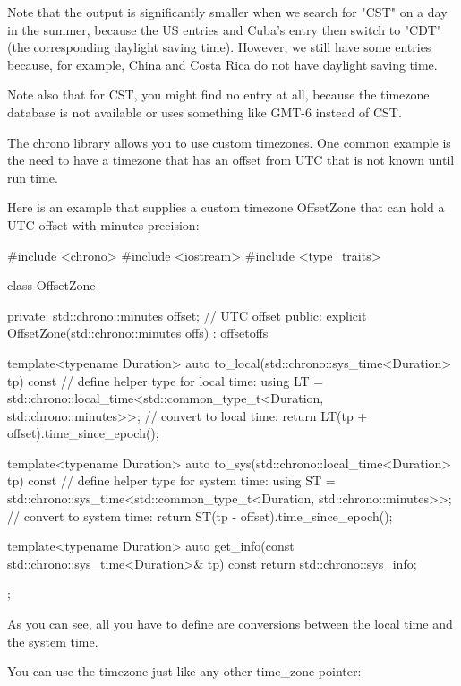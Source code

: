 Note that the output is significantly smaller when we search for "CST" on a day in the summer, because the US entries and Cuba’s entry then switch to "CDT" (the corresponding daylight saving time). However, we still have some entries because, for example, China and Costa Rica do not have daylight saving time.

Note also that for CST, you might find no entry at all, because the timezone database is not available or uses something like GMT-6 instead of CST.


The chrono library allows you to use custom timezones. One common example is the need to have a timezone that has an offset from UTC that is not known until run time.

Here is an example that supplies a custom timezone OffsetZone that can hold a UTC offset with minutes precision:


\begin{cpp}
#include <chrono>
#include <iostream>
#include <type_traits>

class OffsetZone
{
	private:
	std::chrono::minutes offset; // UTC offset
	public:
	explicit OffsetZone(std::chrono::minutes offs)
	: offset{offs} {
	}
	
	template<typename Duration>
	auto to_local(std::chrono::sys_time<Duration> tp) const {
		// define helper type for local time:
		using LT
		= std::chrono::local_time<std::common_type_t<Duration,
													std::chrono::minutes>>;
		// convert to local time:
		return LT{(tp + offset).time_since_epoch()};
	}
	
	template<typename Duration>
	auto to_sys(std::chrono::local_time<Duration> tp) const {
		// define helper type for system time:
		using ST
		= std::chrono::sys_time<std::common_type_t<Duration,
													std::chrono::minutes>>;
		// convert to system time:
		return ST{(tp - offset).time_since_epoch()};
	}
	
	template<typename Duration>
	auto get_info(const std::chrono::sys_time<Duration>& tp) const {
		return std::chrono::sys_info{};
	}
};
\end{cpp}

As you can see, all you have to define are conversions between the local time and the system time.

You can use the timezone just like any other time\_zone pointer:


